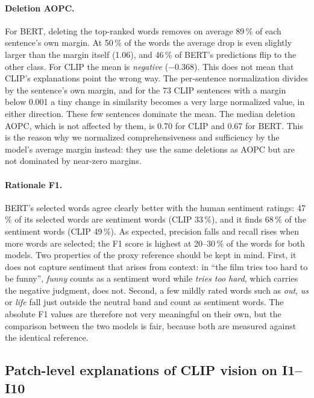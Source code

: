 \documentclass[11pt,a4paper]{article}
\begin{document}
\paragraph{Deletion AOPC.} For BERT, deleting the top-ranked words removes on average 89\,\%
of each sentence's own margin. At 50\,\% of the words the average drop is even slightly
larger than the margin itself (1.06), and 46\,\% of BERT's predictions flip to the other
class. For CLIP the mean is \emph{negative} ($-0.368$). This does not mean that CLIP's
explanations point the wrong way. The per-sentence normalization divides by the sentence's
own margin, and for the 73 CLIP sentences with a margin below 0.001 a tiny change in
similarity becomes a very large normalized value, in either direction. These few sentences
dominate the mean. The median deletion AOPC, which is not affected by them, is 0.70 for
CLIP and 0.67 for BERT. This is the reason why we normalized comprehensiveness and
sufficiency by the model's average margin instead: they use the same deletions as AOPC but
are not dominated by near-zero margins.

\paragraph{Rationale F1.} BERT's selected words agree clearly better with the human
sentiment ratings: 47\,\% of its selected words are sentiment words (CLIP 33\,\%), and it
finds 68\,\% of the sentiment words (CLIP 49\,\%). As expected, precision falls and recall
rises when more words are selected; the F1 score is highest at 20--30\,\% of the words for
both models. Two properties of the proxy reference should be kept in mind. First, it does
not capture sentiment that arises from context: in ``the film tries too hard to be funny'',
\emph{funny} counts as a sentiment word while \emph{tries too hard}, which carries the
negative judgment, does not. Second, a few mildly rated words such as \emph{out},
\emph{us} or \emph{life} fall just outside the neutral band and count as sentiment words.
The absolute F1 values are therefore not very meaningful on their own, but the comparison
between the two models is fair, because both are measured against the identical reference.

\subsection{Patch-level explanations of CLIP vision on I1--I10}
\end{document}
